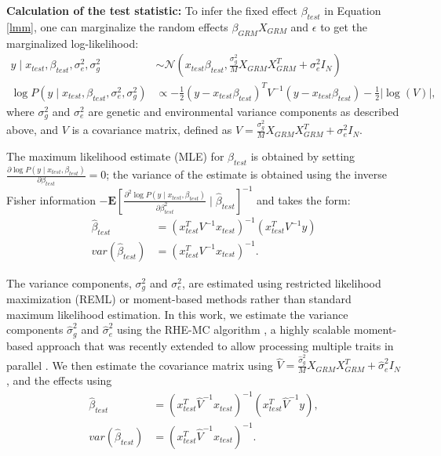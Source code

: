 \textbf{Calculation of the test statistic: }
%
To infer the fixed effect $\beta_{test}$ in Equation \ref{lmm}, one can marginalize the random effects $\beta_{GRM}X_{GRM}$ and $\epsilon$ to get the marginalized log-likelihood:
\begin{align}
    y \mid x_{test}, \beta_{test}, \sigma_e^2, \sigma_g^2 &\sim \mathcal{N}(x_{test}\beta_{test}, \frac{\sigma_g^2}{M} X_{GRM}X_{GRM}^T + \sigma_e^2 I_N) \nonumber \\
    \log P(y \mid x_{test}, \beta_{test}, \sigma_e^2, \sigma_g^2) &\propto -\frac{1}{2} (y-x_{test}\beta_{test})^TV^{-1}(y-x_{test}\beta_{test}) -\frac{1}{2} \lvert \log(V) \rvert,
\label{eq:full_like}
\end{align}
where $\sigma_g^2$ and $\sigma_e^2$ are genetic and environmental variance components as described above, and $V$ is a covariance matrix, defined as $V = \frac{\sigma_g^2}{M} X_{GRM}X_{GRM}^T + \sigma_e^2 I_N$.
%

The maximum likelihood estimate (MLE) for $\beta_{test}$ is obtained by setting $\frac{\partial \log P(y \mid x_{test}, \beta_{test})}{\partial \beta_{test}} = 0$; the variance of the estimate is obtained using the inverse Fisher information $ -\mathbf{E}\left[\frac{\partial ^2 \log P(y \mid x_{test}, \beta_{test})}{\partial \beta_{test}^2} \mid \hat{\beta}_{test}\right]^{-1}$ and takes the form:
\begin{align}
    \hat{\beta}_{test} &= (x_{test}^T V^{-1} x_{test})^{-1}(x_{test}^T V^{-1} y) \nonumber \\
    var(\hat{\beta}_{test}) &=(x_{test}^T V^{-1} x_{test})^{-1} \label{lmm-inf}.
\end{align}

%
The variance components, $\sigma_g^2$ and $\sigma_e^2$, are estimated using restricted likelihood maximization (REML) \cite{loh2015efficient} or moment-based methods \cite{wu2018scalable,pazokitoroudi2020efficient} rather than standard maximum likelihood estimation.
%
In this work, we estimate the variance components $\hat{\sigma}_g^2$ and $\hat{\sigma}_e^2$ using the RHE-MC algorithm \cite{wu2018scalable,pazokitoroudi2020efficient}, a highly scalable moment-based approach that was recently extended to allow processing multiple traits in parallel \cite{zhu2024ARGRHE}.
%
We then estimate the covariance matrix using $\hat{V} = \frac{\hat{\sigma}_g^2}{M} X_{GRM}X_{GRM}^T + \hat{\sigma}_e^2 I_N$, and the effects using
\begin{align}
    \hat{\beta}_{test} &= (x_{test}^T \hat{V}^{-1} x_{test})^{-1}(x_{test}^T \hat{V}^{-1} y), \nonumber \\
    var(\hat{\beta}_{test}) &= (x_{test}^T \hat{V}^{-1} x_{test})^{-1} \label{lmm-inf2}.
\end{align}

